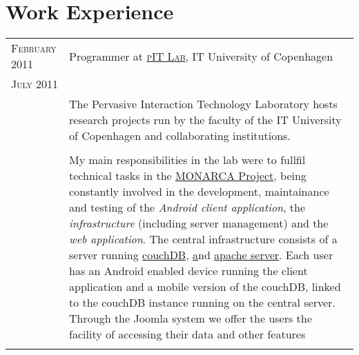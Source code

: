 \documentclass[a4paper,10pt]{article}
\begin{document}
\section{Work Experience}
\begin{tabular}{p{2.5cm}|p{11cm}}

 \raggedleft \textsc{February 2011} & Programmer at
 \textsc{\href{http://www.itu.dk/pit/}{pIT Lab}}, IT University of Copenhagen
 \\\raggedleft \textsc{July 2011}\\& 
 \footnotesize{The Pervasive Interaction Technology Laboratory hosts research
 projects run by the faculty of the IT University of Copenhagen and
 collaborating institutions.}\\ \\

 & \footnotesize{My main responsibilities in the lab were to fullfil technical tasks in the \href{http://www.monarca-project.eu/}{MONARCA Project}, being constantly involved in the  development, maintainance and testing of the \emph{Android client application}, the \emph{infrastructure} (including server management) and the \emph{web application}. The central infrastructure consists of a server running \href{http://couchdb.apache.org}{couchDB}, \href{http://www.joomla.org} and \href{http://httpd.apache.org}{apache server}. Each user has an Android enabled device running the client application and a mobile version of the couchDB, linked to the couchDB instance running on the central server. Through the Joomla system we offer the users the facility of accessing their data and other features
 }\\\\


\end{tabular}
\end{document}

